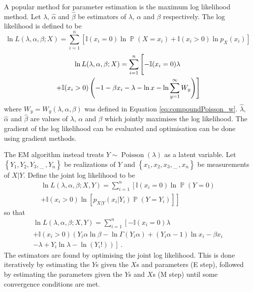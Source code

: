 \documentclass[12pt, a4paper]{memoir}
\DeclareMathOperator{\prob}{\mathbb{P}}
\DeclareMathOperator{\poisson}{Poisson}
\newcommand{\dotdotdot}{_{\phantom{.}\cdots}}
\begin{document}
A popular method for parameter estimation is the maximum log likelihood method. Let $\widehat{\lambda}$, $\widehat{\alpha}$ and $\widehat{\beta}$ be estimators of $\lambda$, $\alpha$ and $\beta$ respectively. The log likelihood is defined to be
\begin{equation*}
	\ln L(\lambda,\alpha,\beta;X) = \sum_{i=1}^n
	\left[
		\mathbb{I}(x_i=0)\ln \prob(X=x_i)
		+\mathbb{I}(x_i>0)\ln p_X(x_i)
	\right]
\end{equation*}
\begin{multline}
	\ln L(\lambda,\alpha,\beta;X) = \sum_{i=1}^n
	\left[
		-\mathbb{I}(x_i=0)\lambda
		\vphantom{\sum_i^i}
	\right.
	\\
	\left.
		+\mathbb{I}(x_i>0)\left(
		-1-\beta x_i-\lambda-\ln x -\ln\sum_{y=1}^\infty W_y
		\right)
	\right]
\end{multline}
where $W_y=W_y(\lambda,\alpha,\beta)$ was defined in Equation \eqref{eq:compoundPoisson_w}. $\widehat{\lambda}$, $\widehat{\alpha}$ and $\widehat{\beta}$ are values of $\lambda$, $\alpha$ and $\beta$ which jointly maximises the log likelihood. The gradient of the log likelihood can be evaluated \citep{dunn2005series} and optimisation can be done using gradient methods.

The EM algorithm \citep{dempster1977maximum} instead treats $Y\sim\poisson(\lambda)$ as a latent variable. Let $\left\{Y_1,Y_2,Y_3,\dotdotdot, Y_n\right\}$ be realizations of $Y$ and $\left\{x_1,x_2,x_3,\dotdotdot, x_n\right\}$ be measurements of $X|Y$. Define the joint log likelihood to be
\begin{multline*}
	\ln L(\lambda,\alpha,\beta;X,Y)
	=
	\sum_{i=1}^n
	\left[
		\mathbb{I}(x_i=0)
		\ln
		\prob(Y=0)
	\right.
	\\
	\left.
		+
		\mathbb{I}(x_i>0)
		\ln
		\left[
			p_{X|Y}(x_i|Y_i)\prob(Y=Y_i)
		\right]
	\right]
\end{multline*}
so that
\begin{multline}
	\ln L(\lambda,\alpha,\beta;X,Y)=
	\sum_{i=1}^n
	\left[
		-\mathbb{I}(x_i=0)
		\lambda
	\right.
	\\
	\left.+
		\mathbb{I}(x_i>0)
		\left(
			Y_i\alpha\ln\beta-\ln\Gamma(Y_i\alpha)+(Y_i\alpha-1)\ln x_i - \beta x_i
		\right.
	\right.
	\\
	\left.
		\left.	
			- \lambda + Y_i \ln \lambda - \ln(Y_i!)
		\right)
	\right]
	\ .
\end{multline}
The estimators are found by optimising the joint log likelihood. This is done iteratively by estimating the $Y$s given the $X$s and parameters (E step), followed by estimating the parameters given the $Y$s and $X$s (M step) until some convergence conditions are met.
\end{document}
